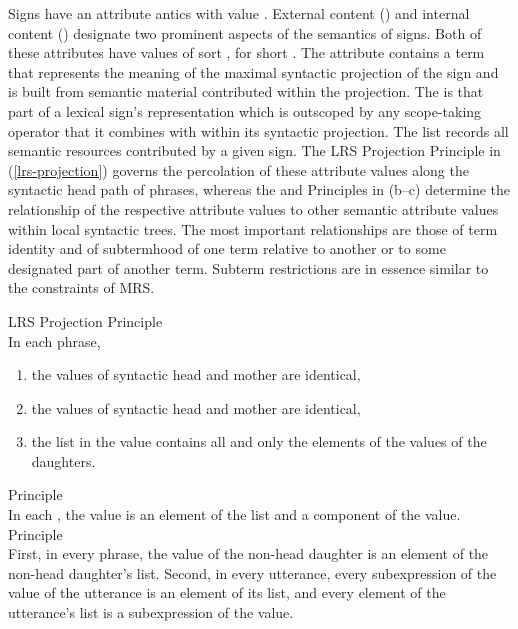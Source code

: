 \documentclass[output=paper
 	        ,biblatex
                ,babelshorthands
                ,newtxmath
                ,draftmode
                ,colorlinks, citecolor=brown
]{langscibook}
\begin{document}
Signs have an attribute antics with value
. External content () and internal content
() designate two prominent aspects of the semantics of
signs. Both of these attributes have
values of sort , for short
. The attribute  contains a term
that represents the meaning of the maximal syntactic projection of the sign
and is built from semantic material contributed within the projection. The
 is that part of a lexical sign's representation which is
outscoped by any scope-taking operator that it combines with within
its syntactic projection. The  list records all semantic
resources contributed by a given sign. The LRS Projection Principle in (\ref{lrs-projection})
governs the percolation of these attribute values along the syntactic
head path of phrases, whereas the  and 
Principles in (b--c) determine the relationship of the respective attribute
values to other semantic attribute values within local syntactic
trees. The most important relationships are those of term identity and
of subtermhood of one term relative to another or to some designated part
of another term. Subterm restrictions are in essence similar
to the  constraints of MRS.

\begin{exe}
  \ex\label{lrs-essent-principles}
  \begin{xlist}
    \ex\label{lrs-projection} LRS Projection Principle\\
    In each phrase,
    \begin{enumerate}
    \item the  values of syntactic head and mother are identical,
    \item the  values of syntactic head and mother are identical,
    \item the list in the  value contains all and only the elements
    of the  values of the daughters.
    \end{enumerate}
    \ex\label{lrs-incont}  Principle\\
    In each , the  value is an element of the
     list and a component of the  value.
    \ex\label{lrs-excont}  Principle\\
    First, in every phrase, the  value of the non-head daughter
    is an element of the non-head daughter's  list. Second, in
    every utterance, every subexpression of the  value of the
    utterance is an element of its  list, and every element of
    the utterance's  list is a subexpression of the 
    value.
  \end{xlist}
\end{exe}
\end{document}
